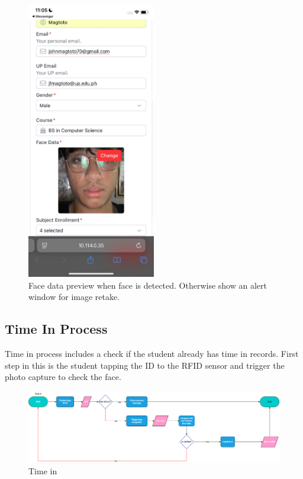\begin{figure}[h] %
	\centering
	\includegraphics[width=0.5\textwidth]{figures/chapter4/student_form_mobile_preview.jpg} %
	\caption{Face data preview when face is detected. Otherwise show an alert window for image retake.}
	\label{fig:student_form_mobile_preview}
\end{figure}
\clearpage
\subsection{Time In Process}
Time in process includes a check if the student already has time in records. First step in this is the student tapping the ID to the RFID sensor and trigger the photo capture to check the face.
\begin{figure}[h] %
	\centering
	\includegraphics[width=1.0\textwidth]{figures/chapter4/Timein2.png} %
	\caption{Time in}
	\label{fig:timein}
\end{figure}

